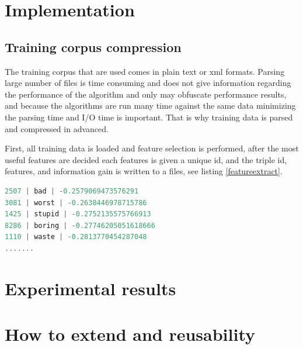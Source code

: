 \documentclass{report}
\begin{document}
\chapter{Implementation}


\section{Training corpus compression}

The training corpus that are used comes in plain text or xml formats. Parsing large number of files is time consuming and does not give information regarding the performance of the algorithm and only may obfuscate performance results, and because the algorithms are run many time against the same data minimizing the parsing time and I/O time is important. That is why training data is parsed and compressed in advanced.

First, all training data is loaded and feature selection is performed, after the most useful features are decided each features is given a unique id, and the triple id, features, and information gain is written to a files, see listing \ref{featureextract}.

\begin{lstlisting}[language=scala, caption={Features file extract}, label={featureextract}]
2507 | bad | -0.2579069473576291
3081 | worst | -0.2638446978715786
1425 | stupid | -0.2752135575766913
8286 | boring | -0.27746205051618666
1110 | waste | -0.2813770454287048
.......
\end{lstlisting}

\chapter{Experimental results}

\chapter{How to extend and reusability}

{}

\end{document}
